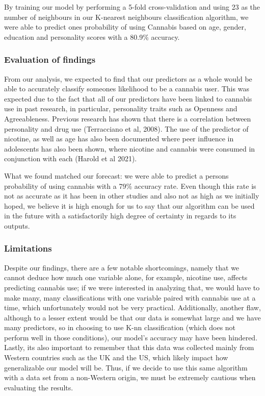\documentclass[
]{article}
\begin{document}
By training our model by performing a 5-fold cross-validation and using
23 as the number of neighbours in our K-nearest neighbours
classification algorithm, we were able to predict one\textquotesingle s probability of
using Cannabis based on age, gender, education and personality scores
with a 80.9\% accuracy.

\hypertarget{evaluation-of-findings}{%
\subsubsection{Evaluation of findings}\label{evaluation-of-findings}}

From our analysis, we expected to find that our predictors as a whole
would be able to accurately classify someone\textquotesingle s likelihood to be a
cannabis user. This was expected due to the fact that all of our
predictors have been linked to cannabis use in past research, in
particular, personality traits such as Openness and Agreeableness.
Previous research has shown that there is a correlation between
personality and drug use (Terracciano et al, 2008). The use of the
predictor of nicotine, as well as age has also been documented where
peer influence in adolescents has also been shown, where nicotine and
cannabis were consumed in conjunction with each (Harold et al 2021).

What we found matched our forecast: we were able to predict a person\textquotesingle s
probability of using cannabis with a 79\% accuracy rate. Even though this
rate is not as accurate as it has been in other studies and also not as
high as we initially hoped, we believe it is high enough for us to say
that our algorithm can be used in the future with a satisfactorily high
degree of certainty in regards to its outputs.

\hypertarget{limitations}{%
\subsubsection{Limitations}\label{limitations}}

Despite our findings, there are a few notable shortcomings, namely that
we cannot deduce how much one variable alone, for example, nicotine use,
affects predicting cannabis use; if we were interested in analyzing
that, we would have to make many, many classifications with one variable
paired with cannabis use at a time, which unfortunately would not be
very practical. Additionally, another flaw, although to a lesser extent
would be that our data is somewhat large and we have many predictors, so
in choosing to use K-nn classification (which does not perform well in
those conditions), our model's accuracy may have been hindered. Lastly,
it\textquotesingle s also important to remember that this data was collected mainly
from Western countries such as the UK and the US, which likely impact
how generalizable our model will be. Thus, if we decide to use this same
algorithm with a data set from a non-Western origin, we must be
extremely cautious when evaluating the results.
\end{document}

